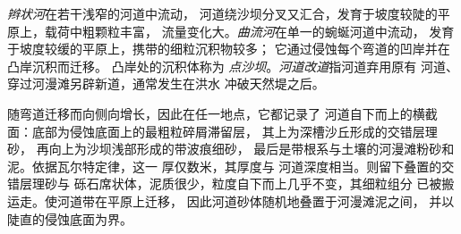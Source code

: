 \begin{definition}[辫状河与曲流河]\label{def:b3:facies-models:rivers}
\emph{辫状河}在若干浅窄的河道中流动，
河道绕沙坝分叉又汇合，发育于坡度较陡的平原上，载荷中粗颗粒丰富，
流量变化大。\emph{曲流河}在单一的蜿蜒河道中流动，
发育于坡度较缓的平原上，携带的细粒沉积物较多；
它通过侵蚀每个弯道的凹岸并在凸岸沉积而迁移。
凸岸处的沉积体称为
\emph{点沙坝}。\emph{河道改道}指河道弃用原有
河道、穿过河漫滩另辟新道，通常发生在洪水
冲破天然堤之后。
\end{definition}

随弯道迁移而向侧向增长，因此在任一地点，它都记录了
河道自下而上的横截面：底部为侵蚀底面上的最粗粒碎屑滞留层，
其上为深槽沙丘形成的交错层理砂，
再向上为沙坝浅部形成的带波痕细砂，
最后是带根系与土壤的河漫滩粉砂和泥。依据瓦尔特定律，这一
厚仅数米，其厚度与
河道深度相当。则留下叠置的交错层理砂与
砾石席状体，泥质很少，粒度自下而上几乎不变，其细粒组分
已被搬运走。使河道带在平原上迁移，
因此河道砂体随机地叠置于河漫滩泥之间，
并以陡直的侵蚀底面为界。

